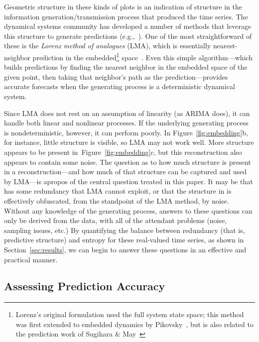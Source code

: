Geometric structure in these kinds of plots is an indication of
structure in the information generation/transmission process that
produced the time series.  The dynamical systems community has
developed a number of methods that leverage this structure to generate
predictions (e.g.,~\cite{weigend-book,casdagli-eubank92,Smith199250}).
One of the most straightforward of these is the \emph{Lorenz method of
  analogues} (LMA), which is essentially nearest-neighbor prediction
in the embedded\footnote{Lorenz's original formulation used the full
  system state space;
%
%
this method was first extended to embedded dynamics by
Pikovsky~\cite{pikovsky86-sov}, but is also related to the prediction
work of Sugihara \& May~\cite{sugihara90}}
space~\cite{lorenz-analogues}.  Even this simple algorithm---which
builds predictions by finding the nearest neighbor in the embedded
space of the given point, then taking that neighbor's path as the
prediction---provides accurate forecasts when the generating process
is a deterministic dynamical system.

Since LMA does not rest on an assumption of linearity (as ARIMA does),
it can handle both linear and nonlinear processes.  If the underlying
generating process is nondeterministic, however, it can perform
poorly.  In Figure~\ref{fig:embedding}b, for instance, little
structure is visible, so LMA may not work well.  More structure
appears to be present in~Figure~\ref{fig:embedding}c, but this
reconstruction also appears to contain some noise.  The question as to
how much structure is present in a reconstruction---and how much of
that structure can be captured and used by LMA---is apropos of the
central question treated in this paper.  It may be that \gcc has some
redundancy that LMA cannot exploit, or that the structure in \svdfive
is effectively obfuscated, from the standpoint of the LMA method, by
noise.  Without any knowledge of the generating process, answers to
these questions can only be derived from the data, with all of the
attendant problems (noise, sampling issues, etc.)  By quantifying the
balance between redundancy (that is, predictive structure) and entropy
for these real-valued time series, as shown in
Section~\ref{sec:results}, we can begin to answer these questions
in an effective and practical manner.


\subsection{Assessing Prediction Accuracy}
\label{sec:accuracy}

